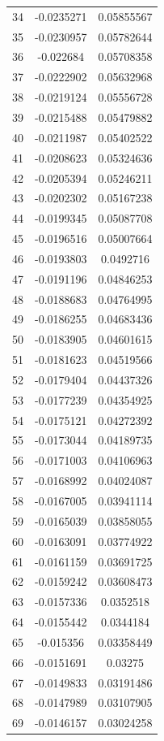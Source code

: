 \documentclass[a4paper, 11pt, oneside]{report}
\begin{document}
{\begin{longtable}{|c|c|c|}
34  & -0.0235271 & 0.05855567 \\
35  & -0.0230957 & 0.05782644 \\
36  & -0.022684  & 0.05708358 \\
37  & -0.0222902 & 0.05632968 \\
38  & -0.0219124 & 0.05556728 \\
39  & -0.0215488 & 0.05479882 \\
40  & -0.0211987 & 0.05402522 \\
41  & -0.0208623 & 0.05324636 \\
42  & -0.0205394 & 0.05246211 \\
43  & -0.0202302 & 0.05167238 \\
44  & -0.0199345 & 0.05087708 \\
45  & -0.0196516 & 0.05007664 \\
46  & -0.0193803 & 0.0492716  \\
47  & -0.0191196 & 0.04846253 \\
48  & -0.0188683 & 0.04764995 \\
49  & -0.0186255 & 0.04683436 \\
50  & -0.0183905 & 0.04601615 \\
51  & -0.0181623 & 0.04519566 \\
52  & -0.0179404 & 0.04437326 \\
53  & -0.0177239 & 0.04354925 \\
54  & -0.0175121 & 0.04272392 \\
55  & -0.0173044 & 0.04189735 \\
56  & -0.0171003 & 0.04106963 \\
57  & -0.0168992 & 0.04024087 \\
58  & -0.0167005 & 0.03941114 \\
59  & -0.0165039 & 0.03858055 \\
60  & -0.0163091 & 0.03774922 \\
61  & -0.0161159 & 0.03691725 \\
62  & -0.0159242 & 0.03608473 \\
63  & -0.0157336 & 0.0352518  \\
64  & -0.0155442 & 0.0344184  \\
65  & -0.015356  & 0.03358449 \\
66  & -0.0151691 & 0.03275    \\
67  & -0.0149833 & 0.03191486 \\
68  & -0.0147989 & 0.03107905 \\
69  & -0.0146157 & 0.03024258 \\

\end{longtable}}
\end{document}
